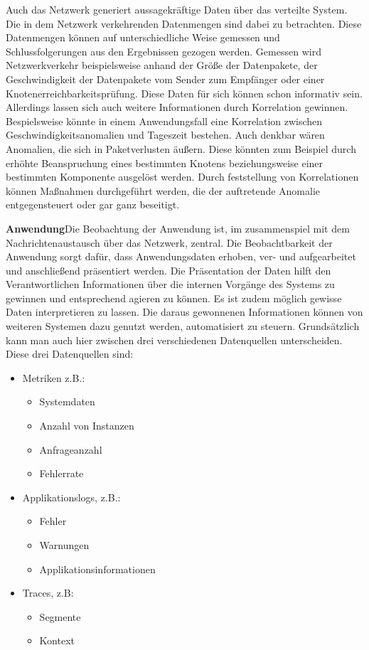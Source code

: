 	Auch das Netzwerk generiert aussagekräftige Daten über das verteilte System. Die in dem Netzwerk verkehrenden Datenmengen sind dabei zu betrachten. Diese Datenmengen können auf unterschiedliche Weise gemessen und Schlussfolgerungen aus den Ergebnissen gezogen werden. Gemessen wird Netzwerkverkehr beispielsweise anhand der Größe der Datenpakete, der Geschwindigkeit der Datenpakete vom Sender zum Empfänger oder einer Knotenerreichbarkeitsprüfung. Diese Daten für sich können schon informativ sein. Allerdings lassen sich auch weitere Informationen durch Korrelation gewinnen. Bespielsweise könnte in einem Anwendungsfall eine Korrelation zwischen Geschwindigkeitsanomalien und Tageszeit bestehen. Auch denkbar wären Anomalien, die sich in Paketverlusten äußern. Diese könnten zum Beispiel durch erhöhte Beanspruchung eines bestimmten Knotens beziehungsweise einer bestimmten Komponente ausgelöst werden. Durch feststellung von Korrelationen können Maßnahmen durchgeführt werden, die der auftretende Anomalie entgegensteuert oder gar ganz beseitigt.
	
	\textbf{Anwendung}\space\space\space Die Beobachtung der Anwendung ist, im zusammenspiel mit dem Nachrichtenaustausch über das Netzwerk, zentral. Die Beobachtbarkeit der Anwendung sorgt dafür, dass Anwendungsdaten erhoben, ver- und aufgearbeitet und anschließend präsentiert werden. Die Präsentation der Daten hilft den Verantwortlichen Informationen über die internen Vorgänge des Systems zu gewinnen und entsprechend agieren zu können. Es ist zudem möglich gewisse Daten interpretieren zu lassen. Die daraus gewonnenen Informationen können von weiteren Systemen dazu genutzt werden, automatisiert zu steuern. Grundsätzlich kann man auch hier zwischen drei verschiedenen Datenquellen unterscheiden. Diese drei Datenquellen sind:
	
	\begin{itemize}
		\item Metriken z.B.:
		\begin{itemize}
			\item Systemdaten
			\item Anzahl von Instanzen
			\item Anfrageanzahl
			\item Fehlerrate
		\end{itemize}
		\item Applikationslogs, z.B.:
		\begin{itemize}
			\item Fehler
			\item Warnungen
			\item Applikationsinformationen
		\end{itemize}
		\item Traces, z.B:
		\begin{itemize}
			\item Segmente
			\item Kontext
		\end{itemize}
	\end{itemize}

